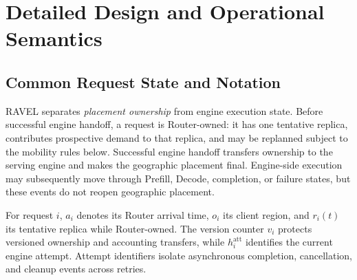 \newcommand{\AppendixPlan}[3]{%
\paragraph{Question addressed.}
#1

\paragraph{Content to include.}
#2

\paragraph{Required evidence.}
#3
}


\section{Detailed Design and Operational Semantics}
\label{app:design-details}


\subsection{Common Request State and Notation}
\label{sec:appendix:state-model}

RAVEL separates \emph{placement ownership} from engine execution state.
Before successful engine handoff, a request is Router-owned: it has one
tentative replica, contributes prospective demand to that replica, and may be
replanned subject to the mobility rules below.
Successful engine handoff transfers ownership to the serving engine and makes
the geographic placement final.
Engine-side execution may subsequently move through Prefill, Decode,
completion, or failure states, but these events do not reopen geographic
placement.

For request $i$, $a_i$ denotes its Router arrival time, $o_i$ its client
region, and $r_i(t)$ its tentative replica while Router-owned.
The version counter $v_i$ protects versioned ownership and accounting
transfers, while $h_i^{\mathrm{att}}$ identifies the current engine attempt.
Attempt identifiers isolate asynchronous completion, cancellation, and cleanup
events across retries.

